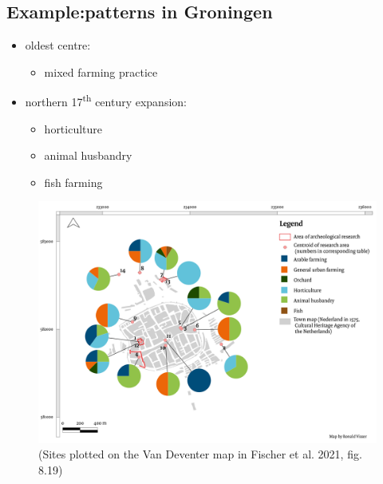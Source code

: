 \documentclass[
  letterpaper,
  DIV=11,
  numbers=noendperiod]{scrartcl}
\providecommand{\tightlist}{%
  \setlength{\itemsep}{0pt}\setlength{\parskip}{0pt}}\usepackage{longtable,booktabs,array}
\begin{document}
\hypertarget{examplepatterns-in-groningen}{%
\subsection{Example:patterns in
Groningen}\label{examplepatterns-in-groningen}}

\begin{itemize}
\tightlist
\item
  oldest centre:

  \begin{itemize}
  \tightlist
  \item
    mixed farming practice
  \end{itemize}
\item
  northern 17\textsuperscript{th} century expansion:

  \begin{itemize}
  \tightlist
  \item
    horticulture
  \item
    animal husbandry
  \item
    fish farming
  \end{itemize}
\end{itemize}

\begin{figure}

{\centering \includegraphics{images/Figure_8.19_Groningen.png}

}

\caption{(Sites plotted on the Van Deventer map in Fischer et al. 2021,
fig. 8.19)}

\end{figure}
\end{document}
